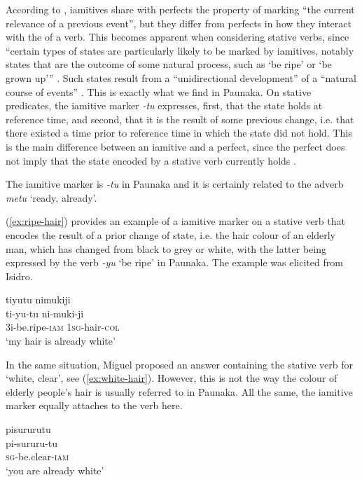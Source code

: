 According to \citet[4]{Olsson2013}, iamitives share with perfects the property of marking “the current relevance of a previous event”, but they differ from perfects in how they interact with the  of a verb. This becomes apparent when considering stative verbs, since “certain types of states are particularly likely to be marked by iamitives, notably states that are the outcome of some natural process, such as ‘be ripe’ or ‘be grown up’” \citep[4]{Olsson2013}. Such states result from a “unidirectional development” of a “natural course of events” \citep[30]{Olsson2013}. This is exactly what we find in Paunaka. On stative predicates, the iamitive marker \textit{-tu} expresses, first, that the state holds at reference time, and second, that it is the result of some previous change, i.e. that there existed a time prior to reference time in which the state did not hold. This is the main difference between an iamitive and a perfect, since the perfect does not imply that the state encoded by a stative verb currently holds \citep[cf.][9]{Olsson2013}.

The iamitive marker is \textit{-tu} in Paunaka and it is certainly related to the adverb \textit{metu} ‘ready, already’.

(\ref{ex:ripe-hair}) provides an example of a iamitive marker on a stative verb that encodes the result of a prior change of state, i.e. the hair colour of an elderly man, which has changed from black to grey or white, with the latter being expressed by the verb \textit{-yu} ‘be ripe’ in Paunaka. The example was elicited from Isidro.

\ea\label{ex:ripe-hair}
\begingl 
\glpreamble tiyutu nimukiji\\
\gla ti-yu-tu ni-muki-ji\\ 
\glb 3i-be.ripe-\textsc{iam} 1\textsc{sg}-hair-\textsc{col}\\ 
\glft ‘my hair is already white’\\ 
\endgl
\trailingcitation{[mdx-c120416ls.150]}%
\xe

In the same situation, Miguel proposed an answer containing the stative verb for ‘white, clear’, see (\ref{ex:white-hair}). However, this is not the way the colour of elderly people’s hair is usually referred to in Paunaka. All the same, the iamitive marker equally attaches to the verb here.

\ea\label{ex:white-hair}
\begingl
\glpreamble pisururutu\\
\gla pi-sururu-tu\\
\textsc{sg}-be.clear-\textsc{iam}\\
\glft ‘you are already white’
\endgl
\trailingcitation{[mdx-c120416ls.143]}
\xe



